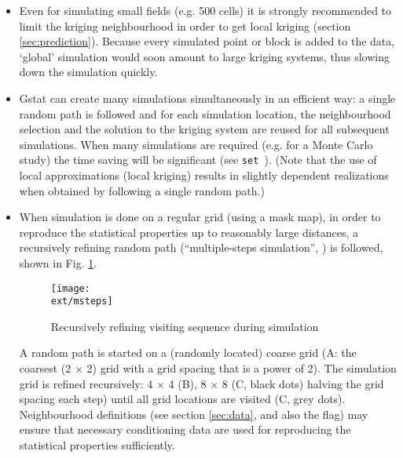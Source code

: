 \documentclass[a4paper,12pt]{book}
\newcommand{\ext}{pdf}
\renewcommand{\cite}{\citet}
\newcommand{\code}[1]{\texttt{#1}}
\newcommand{\iskey}[1]{\htmlref{\code{{#1}}}{key:#1}}
\begin{document}
\begin{itemize}

\item Even for simulating small fields (e.g. 500 cells) it is strongly
recommended to limit the kriging neighbourhood in order to get local
kriging (section \ref{sec:prediction}). Because every simulated point
or block is added to the data, `global' simulation would soon amount to
large kriging systems, thus slowing down the simulation quickly.

\item Gstat can create many simulations simultaneously in an efficient
way: a single random path is followed and for each simulation location,
the neighbourhood selection and the solution to the kriging system are
reused for all subsequent simulations. When many simulations are required
(e.g. for a Monte Carlo study) the time saving will be significant
(see {\tt set \iskey{nsim}}). (Note that the use of local approximations
(local kriging) results in slightly dependent realizations when obtained
by following a single random path.)

\item When simulation is done on a regular grid (using a mask map), in
order to reproduce the statistical properties up to reasonably large
distances, a recursively refining random path (``multiple-steps
simulation'', \cite{gomez93}) is followed, shown in
Fig. \ref{fig:msteps}.

\begin{figure}[t]
\begin{center}
 \texttt{[image: \\ext/msteps]}
\end{center}
\caption{Recursively refining visiting sequence during simulation}
\label{fig:msteps}
\end{figure}

A random path is started on a (randomly located) coarse grid (A: the
coarsest (2 $\times$ 2) grid with a grid spacing that is a power of 2).
The simulation grid is refined recursively: 4 $\times$ 4 (B), 8 $\times$
8 (C, black dots) halving the grid spacing each step) until all grid
locations are visited (C, grey dots). Neighbourhood definitions (see
section \ref{sec:data}, and also the \iskey{force} flag) may ensure that
necessary conditioning data are used for reproducing the statistical
properties sufficiently.


\end{itemize}
\end{document}
